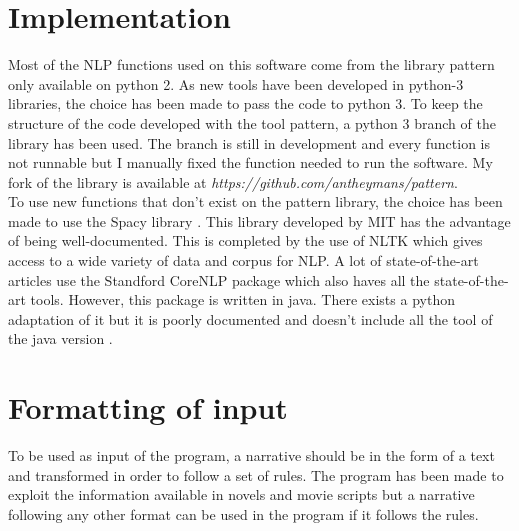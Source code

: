 \documentclass[a4paper, 12pt]{report}
\begin{document}
\section{Implementation}

Most of the NLP functions used on this software come from the library pattern \citep{pattern} only available on python 2. As new tools have been developed in python-3 libraries, the choice has been made to pass the code to python 3.
To keep the structure of the code developed with the tool pattern, a python 3 branch of the library has been used. The branch is still in development and every function is not runnable but I manually fixed the function needed to run the software. My fork of the library is available at \textit{https://github.com/antheymans/pattern}.\\

To use new functions that don't exist on the pattern library, the choice has been made to use the Spacy library \citep{spacy}. This library developed by MIT has the advantage of being well-documented. This is completed by the use of NLTK \citep{NLTK} which gives access to a wide variety of data and corpus for NLP. A lot of state-of-the-art articles use the Standford CoreNLP package \citep{CoreNLP} which also haves all the state-of-the-art tools. However, this package is written in java. There exists a python adaptation of it but it is poorly documented and doesn't include all the tool of the java version \citep{CoreNLPPython}.\\


\section{Formatting of input}
To be used as input of the program, a narrative should be in the form of a text and transformed in order to follow a set of rules. The program has been made to exploit the information available in novels and movie scripts but a narrative following any other format can be used in the program if it follows the rules.
\end{document}
